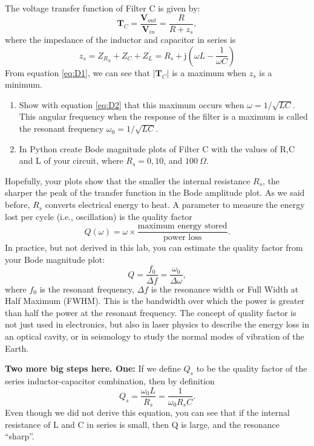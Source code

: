 \documentclass{article}
\begin{document}
The voltage transfer function of Filter C is given by:
\begin{equation}
  \mathbf{T}_C=\frac{\mathbf{V}_{out}}{\mathbf{V}_{in}}=\frac{R}{R+z_s},
  \label{eq:D1}
\end{equation}
where the impedance of the inductor and capacitor in series is
\begin{equation}
  z_s=Z_{R_S}+ Z_C + Z_L = R_s+\mathrm{j}\left(\omega L-\frac{1}{\omega  C}\right)
  \label{eq:D2}
\end{equation}
From equation \ref{eq:D1}, we can see that $|\mathbf{T}_C|$ is a maximum
when $z_s$ is a minimum.
\begin{enumerate}
\item Show with equation \ref{eq:D2} that this maximum occurs when
  $\omega=1/\sqrt{LC}$.  This angular frequency when the response of
  the filter is a maximum is called the resonant frequency
  $\omega_0 = 1/\sqrt{LC}$.
\item In Python create Bode magnitude plots of Filter C with the
  values of R,C and L of your circuit, where $R_s = 0,10$, and
  $100~\Omega$.
\end{enumerate}
Hopefully, your plots show that the smaller the internal resistance
$R_s$, the sharper the peak of the transfer function in the Bode
amplitude plot. As we said before, $R_s$ converts electrical energy to
heat. A parameter to measure the energy lost per cycle (i.e.,
oscillation) is the quality factor
\begin{equation}
  Q(\omega )=
  \omega \times {\frac {\text{maximum energy stored}}{\text{power loss}}}.
\end{equation}
In practice, but not derived in this lab, you can estimate the
quality factor from your Bode magnitude plot:
\begin{equation}
  Q =  \frac {f_0}{\Delta f}=\frac {\omega _0}{\Delta \omega },
\end{equation}
where $f_0$ is the resonant frequency, $\Delta f$ is the resonance
width or Full Width at Half Maximum (FWHM). This is the bandwidth over
which the power is greater than half the power at the resonant
frequency. The concept of quality factor is not just used in
electronics, but also in laser physics to describe the energy loss in
an optical cavity, or in seismology to study the normal modes of
vibration of the Earth.

{\bf Two more big steps here. One:}
If we define $Q_s$ to be the quality factor of the
series inductor-capacitor combination, then by definition
\begin{equation}
  Q_s =\frac{\omega_0 L}{R_s}=\frac{1}{\omega_0 R_s C}.
\end{equation}
Even though we did not derive this equation, you can see that if the
internal resistance of L and C in series is small, then Q is large,
and the resonance ``sharp''.
\end{document}
